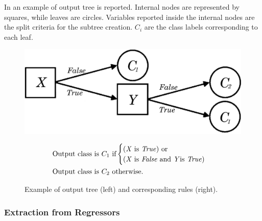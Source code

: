 \documentclass[12pt,a4paper,openright,twoside]{book}
\begin{document}
In  an example of output tree is reported.
%
Internal nodes are represented by squares, while leaves are circles.
%
Variables reported inside the internal nodes are the split criteria for the subtree creation.
%
$C_i$ are the class labels corresponding to each leaf.

\begin{figure}
    \centering
    \begin{minipage}{0.4\textwidth}
        \includegraphics[width=\linewidth]{figures/tree.pdf}
    \end{minipage}
    \hspace{0.2cm}
    \vrule
    \hspace{0.2cm}
    \begin{minipage}{0.45\textwidth}
        \begin{align*}
            \begin{split}
                \text{Output} ~ & \text{class is} ~ C_1 ~ \text{if}
                \begin{cases}
                    ( \mathit{X} ~ \text{is \textit{True}} ) ~ \text{or} \\
                    ( \mathit{X} ~ \text{is \textit{False} and} ~ \mathit{Y} \text{is \textit{True}} )
                \end{cases}
                \\
                \text{Output} ~ & \text{class is} ~ C_2 ~ \text{otherwise.}
            \end{split}
        \end{align*}

    \end{minipage}
    \caption{Example of \trepan{} output tree (left) and corresponding rules (right).}
    \label{fig:trepanTree}
\end{figure}

\subsubsection{Extraction from Regressors}\label{ssec:regressors}
\end{document}
